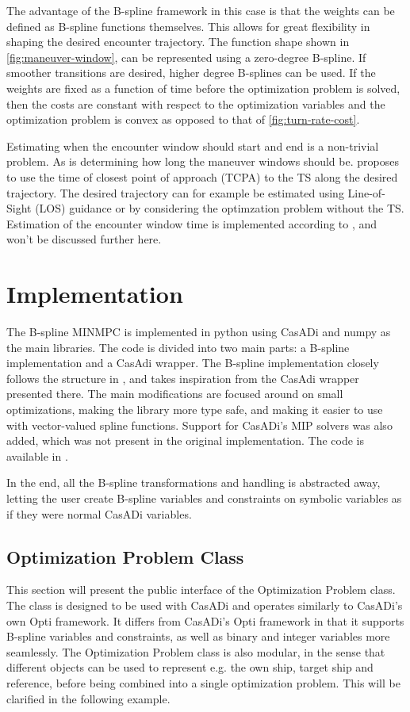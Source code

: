 The advantage of the B-spline framework in this case is that the weights can be defined as B-spline functions themselves. This allows for great flexibility in shaping the desired encounter trajectory. The function shape shown in \cref{fig:maneuver-window}, can be represented using a zero-degree B-spline. If smoother transitions are desired, higher degree B-splines can be used.
If the weights are fixed as a function of time before the optimization problem is solved, then the costs are constant with respect to the optimization variables and the optimization problem is convex as opposed to that of \cref{fig:turn-rate-cost}.

Estimating when the encounter window should start and end is a non-trivial problem. As is determining how long the maneuver windows should be. \cite{Thyri2022-MPC} proposes to use the time of closest point of approach (TCPA) to the TS along the desired trajectory. The desired trajectory can for example be estimated using Line-of-Sight (LOS) guidance \citep{Fossen2011-Handbook} or by considering the optimzation problem without the TS. Estimation of the encounter window time is implemented according to \cite{Thyri2022-MPC}, and won't be discussed further here.


\section{Implementation}\label{sec:python-implementation}

The B-spline MINMPC is implemented in python using CasADi \citep{casadi} and numpy \citep{numpy} as the main libraries. The code is divided into two main parts: a B-spline implementation and a CasAdi wrapper. 
The B-spline implementation closely follows the structure in \citet{mercy2016spline}, and takes inspiration from the CasAdi wrapper presented there. The main modifications are focused around on small optimizations, making the library more type safe, and making it easier to use with vector-valued spline functions. Support for CasADi's MIP solvers was also added, which was not present in the original implementation. 
The code is available in .

In the end, all the B-spline transformations and handling is abstracted away, letting the user create B-spline variables and constraints on symbolic variables as if they were normal CasADi variables. 

\subsection{Optimization Problem Class}
This section will present the public interface of the Optimization Problem class. The class is designed to be used with CasADi and operates similarly to CasADi's own Opti framework. It differs from CasADi's Opti framework in that it supports B-spline variables and constraints, as well as binary and integer variables more seamlessly. The Optimization Problem class is also modular, in the sense that different objects can be used to represent e.g. the own ship, target ship and reference, before being combined into a single optimization problem. This will be clarified in the following example.


